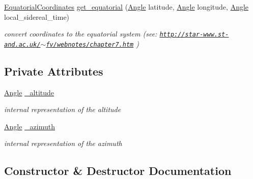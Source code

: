 \begin{DoxyCompactItemize}
\mbox{\hyperlink{classEquatorialCoordinates}{Equatorial\+Coordinates}} \mbox{\hyperlink{classHorizontalCoordinates_a1513f50fc1bdd2ded9934e783ada4e86}{get\+\_\+equatorial}} (\mbox{\hyperlink{classAngle}{Angle}} latitude, \mbox{\hyperlink{classAngle}{Angle}} longitude, \mbox{\hyperlink{classAngle}{Angle}} local\+\_\+sidereal\+\_\+time)
\begin{DoxyCompactList}\small\item\em convert coordinates to the equatorial system (see\+: \href{http://star-www.st-and.ac.uk/~fv/webnotes/chapter7.htm}{\tt http\+://star-\/www.\+st-\/and.\+ac.\+uk/$\sim$fv/webnotes/chapter7.\+htm} ) \end{DoxyCompactList}\end{DoxyCompactItemize}
\subsection*{Private Attributes}
\begin{DoxyCompactItemize}
\item 
\mbox{\label{classHorizontalCoordinates_a4c31b8c5655757a613db12de45e275d2}} 
\mbox{\hyperlink{classAngle}{Angle}} \mbox{\hyperlink{classHorizontalCoordinates_a4c31b8c5655757a613db12de45e275d2}{\+\_\+altitude}}
\begin{DoxyCompactList}\small\item\em internal representation of the altitude \end{DoxyCompactList}\item 
\mbox{\label{classHorizontalCoordinates_a4763500bc46d7b910fcb043b69bdc3d2}} 
\mbox{\hyperlink{classAngle}{Angle}} \mbox{\hyperlink{classHorizontalCoordinates_a4763500bc46d7b910fcb043b69bdc3d2}{\+\_\+azimuth}}
\begin{DoxyCompactList}\small\item\em internal representation of the azimuth \end{DoxyCompactList}\end{DoxyCompactItemize}


\subsection{Constructor \& Destructor Documentation}
\mbox{\label{classHorizontalCoordinates_ac5b7b0e7f60d7fdb97b7a36c3adedfe3}} 

